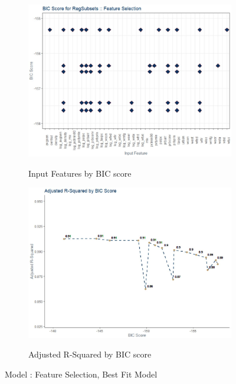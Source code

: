 \begin{figure}[!ht]
	\begin{subfigure}[b]{0.5\textwidth}
		\centering
		\caption{Input Features by BIC score}
		\includegraphics[width=\linewidth]{images/Model_2_feature_selection_bic.jpg}
		\label{fig:Model2 Feature Selection BIC scores}
	\end{subfigure}\vspace{3mm}%
	\hfill
	\begin{subfigure}[b]{0.5\textwidth}
		\centering
		\caption{Adjusted R-Squared by BIC score}
		\includegraphics[width=\linewidth]{images/Model_2_feature_selection_adjr2.jpg}
		\label{fig:Model2 Adjusted R-Squared by BIC}
	\end{subfigure}
	\label{fig:Model2 Feature Selection}
	\caption{Model : Feature Selection, Best Fit Model}
\end{figure}

